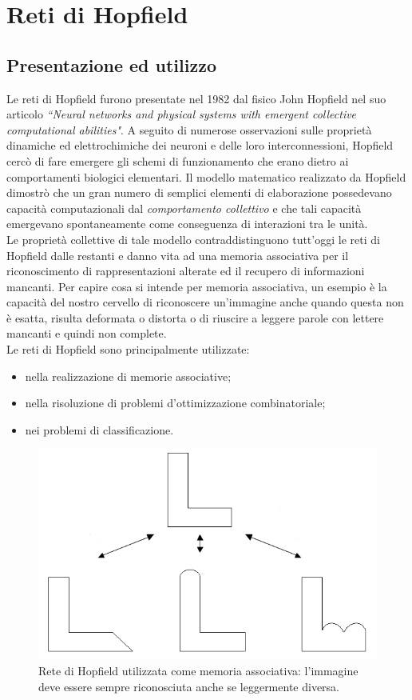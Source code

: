 \documentclass[12pt,a4paper,oneside]{book}
\begin{document}




	
\chapter{Reti di Hopfield}

	\section{Presentazione ed utilizzo}
	
	Le reti di Hopfield furono presentate nel 1982 dal fisico John Hopfield nel suo articolo \textit{``Neural networks and physical systems with emergent collective computational abilities"}. A seguito di numerose osservazioni sulle proprietà dinamiche ed elettrochimiche dei neuroni e delle loro interconnessioni, Hopfield cercò di fare emergere gli schemi di funzionamento che erano dietro ai comportamenti biologici elementari. Il modello matematico realizzato da Hopfield dimostrò che un gran numero di semplici elementi di elaborazione possedevano capacità computazionali dal \emph{comportamento collettivo} e che tali capacità emergevano spontaneamente come conseguenza di interazioni tra le unità.\\
	Le proprietà collettive di tale modello contraddistinguono tutt'oggi le reti di Hopfield dalle restanti e danno vita ad una memoria associativa per il riconoscimento di rappresentazioni alterate ed il recupero di informazioni mancanti. Per capire cosa si intende per memoria associativa, un esempio è la capacità del nostro cervello di riconoscere un'immagine anche quando questa non è esatta, risulta deformata o distorta o di riuscire a leggere parole con lettere mancanti e quindi non complete.\\
	Le reti di Hopfield sono principalmente utilizzate:

	\begin{itemize}
		\item nella realizzazione di memorie associative;
		\item nella risoluzione di problemi d'ottimizzazione combinatoriale;
		\item nei problemi di classificazione.
	\end{itemize}

	\begin{figure}[h]
	\centering
	\includegraphics[width=0.55\linewidth]{IMMAGINI/riconoscimento}
	\caption{ Rete di Hopfield utilizzata come memoria associativa: l'immagine deve essere sempre riconosciuta anche se leggermente diversa.}
	\label{fig:riconoscimento}
	\end{figure}
\end{document}
